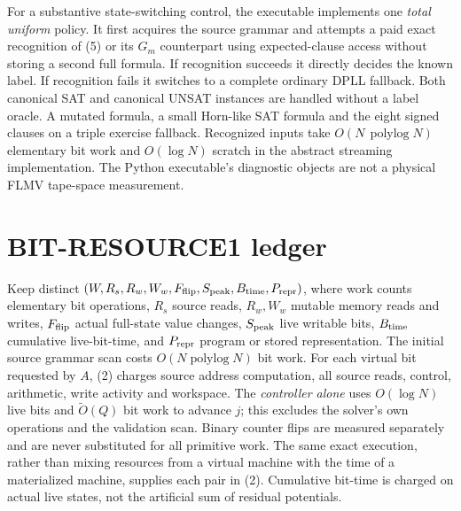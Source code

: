 \documentclass[11pt]{article}
\newcommand{\polylog}{\operatorname{polylog}}
\begin{document}
For a substantive state-switching control, the executable
implements one \emph{total uniform} policy. It first acquires the
source grammar and attempts a paid exact recognition of (5) or
its $G_m$ counterpart using expected-clause access without storing
a second full formula. If recognition succeeds it directly decides
the known label. If recognition fails it switches to a complete
ordinary DPLL fallback. Both canonical SAT and canonical UNSAT
instances are handled without a label oracle. A mutated formula,
a small Horn-like SAT formula and the eight signed clauses on a
triple exercise fallback. Recognized inputs take
$O(N\,\polylog N)$ elementary bit work and $O(\log N)$
scratch in the abstract streaming implementation.
The Python executable's diagnostic objects are not a physical
FLMV tape-space measurement.

\section{BIT-RESOURCE1 ledger}
Keep distinct $(W,R_s,R_w,W_w,F_{\rm flip},S_{\rm peak},
B_{\rm time},P_{\rm repr})$, where work counts elementary bit
operations, $R_s$ source reads, $R_w,W_w$ mutable memory reads and
writes, $F_{\rm flip}$ actual full-state value changes,
$S_{\rm peak}$ live writable bits, $B_{\rm time}$ cumulative
live-bit-time, and $P_{\rm repr}$ program or stored representation.
The initial source grammar scan costs $O(N\polylog N)$ bit work.
For each virtual bit requested by $A$, (2) charges source
address computation, all source reads, control, arithmetic,
write activity and workspace. The \emph{controller alone}
uses $O(\log N)$ live bits and
$\widetilde O(Q)$ bit work to advance $j$;
this excludes the solver's own operations and the validation scan.
Binary counter flips are measured separately and are never
substituted for all primitive work. The same exact execution,
rather than mixing resources from a virtual machine with the
time of a materialized machine, supplies each pair in (2).
Cumulative bit-time is charged on actual live states, not
the artificial sum of residual potentials.
\end{document}
